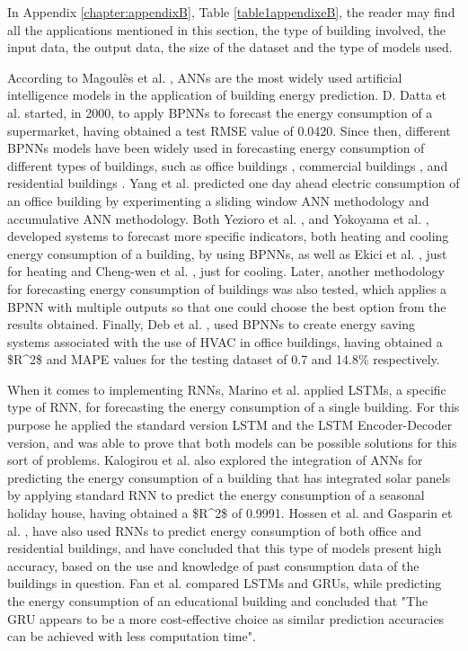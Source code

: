 In Appendix \ref{chapter:appendixB}, Table \ref{table1appendixeB}, the reader may find all the applications mentioned in this section, the type of building involved, the input data, the output data, the size of the dataset and the type of models used. 

According to Magoulès et al. \cite{ann1}, \ac{ANNs} are the most widely used artificial intelligence models in the application of building energy prediction. D. Datta et al. \cite{annr1} started, in 2000, to apply \ac{BPNN}s to forecast the energy consumption of a supermarket, having obtained a test \ac{RMSE} value of 0.0420. Since then, different \ac{BPNN}s models have been widely used in forecasting energy consumption of different types of buildings, such as office buildings \cite{annr17}, commercial buildings \cite{annr13}\cite{annr9}, and residential buildings \cite{annr19}. Yang et al. \cite{annr3} predicted one day ahead electric consumption of an office building by experimenting a sliding window \ac{ANN} methodology and accumulative \ac{ANN} methodology. Both Yezioro et al. \cite{annr5}, and Yokoyama et al. \cite{annr7}, developed systems to forecast more specific indicators, both heating and cooling energy consumption of a building, by using \ac{BPNN}s, as well as Ekici et al. \cite{annr6}, just for heating and Cheng-wen et al. \cite{annr8}, just for cooling. Later, another methodology for forecasting energy consumption of buildings was also tested, which applies a \ac{BPNN} with multiple outputs \cite{annr10} so that one could choose the best option from the results obtained. Finally, Deb et al. \cite{annr20}, used \ac{BPNN}s to create energy saving systems associated with the use of \ac{HVAC} in office buildings, having obtained a \ac{$R^2$} and \ac{MAPE} values for the testing dataset of 0.7 and 14.8\% respectively.

When it comes to implementing \ac{RNN}s, Marino et al. \cite{annr14} applied \ac{LSTM}s, a specific type of \ac{RNN}, for forecasting the energy consumption of a single building. For this purpose he applied the standard version \ac{LSTM} and the  LSTM Encoder-Decoder version, and was able to prove that both models can be possible solutions for this sort of problems. Kalogirou et al. \cite{annr2} also explored the integration of \ac{ANNs} for predicting the energy consumption of a building that has integrated solar panels by applying standard \ac{RNN} to predict the energy consumption of a seasonal holiday house, having obtained a \ac{$R^2$} of 0.9991. Hossen et al. \cite{annr18} and Gasparin et al. \cite{annr21}, have also used \ac{RNN}s to predict energy consumption of both office and residential buildings, and have concluded that this type of models present high accuracy, based on the use and knowledge of past consumption data of the buildings in question. Fan et al. \cite{annr26} compared \ac{LSTM}s and \ac{GRU}s, while predicting the energy consumption of an educational building and concluded that "The \ac{GRU} appears to be a more cost-effective choice as similar prediction accuracies can be achieved with less computation time".


